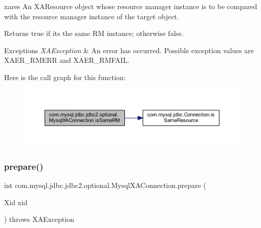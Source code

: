 xares An X\+A\+Resource object whose resource manager instance is to be compared with the resource manager instance of the target object.

\begin{DoxyReturn}{Returns}
true if it\textquotesingle{}s the same RM instance; otherwise false.
\end{DoxyReturn}

\begin{DoxyExceptions}{Exceptions}
{\em X\+A\+Exception} & An error has occurred. Possible exception values are X\+A\+E\+R\+\_\+\+R\+M\+E\+RR and X\+A\+E\+R\+\_\+\+R\+M\+F\+A\+IL. \\
\hline
\end{DoxyExceptions}
Here is the call graph for this function\+:
\nopagebreak
\begin{figure}[H]
\begin{center}
\leavevmode
\includegraphics[width=350pt]{classcom_1_1mysql_1_1jdbc_1_1jdbc2_1_1optional_1_1_mysql_x_a_connection_a352f65f22228587f43c93e280c679496_cgraph}
\end{center}
\end{figure}
\mbox{\label{classcom_1_1mysql_1_1jdbc_1_1jdbc2_1_1optional_1_1_mysql_x_a_connection_a6321a959e44d23678afc54a8c2f9828f}} 
\subsubsection{\texorpdfstring{prepare()}{prepare()}}
{\footnotesize\ttfamily int com.\+mysql.\+jdbc.\+jdbc2.\+optional.\+Mysql\+X\+A\+Connection.\+prepare (\begin{DoxyParamCaption}\item[{Xid}]{xid }\end{DoxyParamCaption}) throws X\+A\+Exception}

